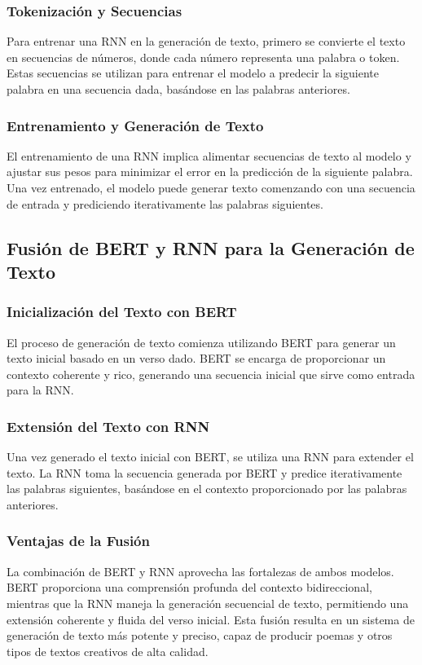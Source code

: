 \subsubsection*{Tokenización y Secuencias}
Para entrenar una RNN en la generación de texto, primero se convierte el texto en secuencias de números, donde cada número representa una palabra o token. Estas secuencias se utilizan para entrenar el modelo a predecir la siguiente palabra en una secuencia dada, basándose en las palabras anteriores.

\subsubsection*{Entrenamiento y Generación de Texto}
El entrenamiento de una RNN implica alimentar secuencias de texto al modelo y ajustar sus pesos para minimizar el error en la predicción de la siguiente palabra. Una vez entrenado, el modelo puede generar texto comenzando con una secuencia de entrada y prediciendo iterativamente las palabras siguientes.

\subsection{Fusión de BERT y RNN para la Generación de Texto}

\subsubsection*{Inicialización del Texto con BERT}
El proceso de generación de texto comienza utilizando BERT para generar un texto inicial basado en un verso dado. BERT se encarga de proporcionar un contexto coherente y rico, generando una secuencia inicial que sirve como entrada para la RNN.

\subsubsection*{Extensión del Texto con RNN}
Una vez generado el texto inicial con BERT, se utiliza una RNN para extender el texto. La RNN toma la secuencia generada por BERT y predice iterativamente las palabras siguientes, basándose en el contexto proporcionado por las palabras anteriores.

\subsubsection*{Ventajas de la Fusión}
La combinación de BERT y RNN aprovecha las fortalezas de ambos modelos. BERT proporciona una comprensión profunda del contexto bidireccional, mientras que la RNN maneja la generación secuencial de texto, permitiendo una extensión coherente y fluida del verso inicial. Esta fusión resulta en un sistema de generación de texto más potente y preciso, capaz de producir poemas y otros tipos de textos creativos de alta calidad.


